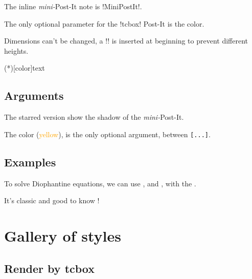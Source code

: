 \documentclass[english,a4paper,11pt]{article}
\newcommand\Cle[1]{{\small\sffamily\textlangle \textcolor{orange}{#1}\textrangle}}
\begin{document}
\begin{cautionblock}
The inline \textit{mini-}Post-It note is \motcletex!MiniPostIt!.

The only optional parameter for the \motcletex!tcbox! Post-It is the color.

\smallskip

Dimensions can't be changed, a \motcletex!\vphantom! is inserted at beginning to prevent different heights.
\end{cautionblock}

\begin{DemoCode}
\MiniPostIt(*)[color]{text}
\end{DemoCode}

\subsection{Arguments}

\begin{noteblock}
The starred version show the shadow of the \textit{mini-}Post-It.

The color (\Cle{yellow}), is the only optional argument, between \texttt{[...]}.
\end{noteblock}

\subsection{Examples}

\begin{DemoCode}[]
To solve Diophantine equations, we can use , and , with the .

It's classic and good to know !
\end{DemoCode}

\pagebreak

\section{Gallery of styles}

\subsection{Render by tcbox}
\end{document}
